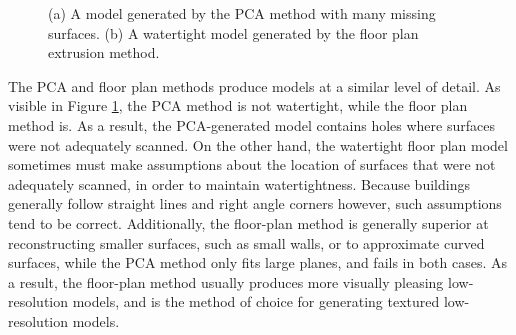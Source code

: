\documentclass[]{spie}  %
\begin{document}
\begin{figure}
  \centering {} 
  \caption{(a) A model generated by the PCA method with many missing
    surfaces. (b) A watertight model generated by the floor plan
    extrusion method.}
  \label{fig:lowresmodels}
\end{figure}

The PCA and floor plan methods produce models at a similar level of
detail. As visible in Figure \ref{fig:lowresmodels}, the PCA method is
not watertight, while the floor plan method is. As a result, the
PCA-generated model contains holes where surfaces were not adequately
scanned. On the other hand, the watertight floor plan model sometimes
must make assumptions about the location of surfaces that were not
adequately scanned, in order to maintain watertightness. Because
buildings generally follow straight lines and right angle corners
however, such assumptions tend to be correct. Additionally, the
floor-plan method is generally superior at reconstructing smaller
surfaces, such as small walls, or to approximate curved surfaces,
while the PCA method only fits large planes, and fails in both
cases. As a result, the floor-plan method usually produces more
visually pleasing low-resolution models, and is the method of choice
for generating textured low-resolution models.
\end{document}
